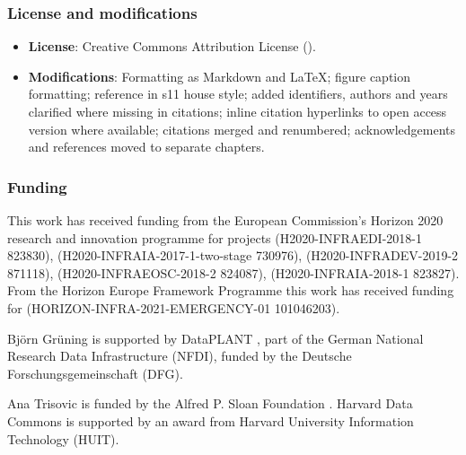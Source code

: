\subsubsection*{License and modifications}

\begin{itemize}
\tightlist
\item
  \textbf{License}: Creative Commons Attribution License
  ().
\item
  \textbf{Modifications}: Formatting as Markdown and LaTeX; figure caption
  formatting; reference in s11 house style; added identifiers, authors
  and years clarified where missing in citations; inline citation
  hyperlinks to open access version where available; citations merged and renumbered; 
  acknowledgements and references moved to separate chapters.
\end{itemize}


\subsubsection*{Funding}

This work has received funding from the European Commission's Horizon
2020 research and innovation programme for projects
(H2020-INFRAEDI-2018-1 823830),
(H2020-INFRAIA-2017-1-two-stage 730976),
(H2020-INFRADEV-2019-2 871118),
(H2020-INFRAEOSC-2018-2 824087),
(H2020-INFRAIA-2018-1 823827). From the Horizon Europe Framework
Programme this work has received funding for
(HORIZON-INFRA-2021-EMERGENCY-01 101046203).

Björn Grüning is supported by DataPLANT
, part of the German National Research Data Infrastructure
(NFDI), funded by the Deutsche Forschungsgemeinschaft (DFG).

Ana Trisovic is funded by the Alfred P. Sloan Foundation
.
Harvard Data Commons is supported by an award from Harvard University
Information Technology (HUIT).



